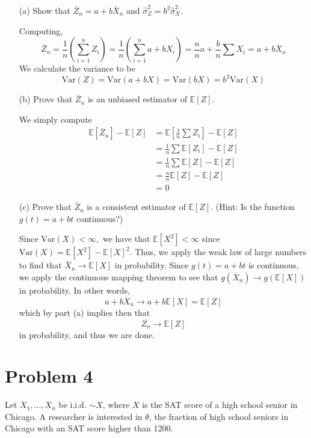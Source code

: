 \documentclass[11pt]{article}
\newcommand{\Var}{\text{Var}}
\newcommand{\bbE}{\mathbb{E}}
\begin{document}
\begin{enumerate}
    \item[(a)] Show that \( \bar{Z}_n = a + b \bar{X}_n \) and \( \hat{\sigma}_Z^2 = b^2 \hat{\sigma}_X^2 \).
\begin{solution}
Computing, 
\[\overline{Z}_n = \frac{1}{n}(\sum_{i=1}^n Z_i) = \frac{1}{n}(\sum_{i=1}^n a + bX_i)=  \frac{n}{n}a + \frac{b}{n}\sum X_i = a + b \overline{X}_n \]
We calculate the variance to be 
\[\Var(Z) = \Var(a + bX) = \Var(bX) = b^2 \Var(X)\]
\end{solution}
    \item[(b)] Prove that \( \bar{Z}_n \) is an unbiased estimator of \( \mathbb{E}[Z] \).
\begin{solution}
    We simply compute 
\begin{align*}
    \bbE[\overline{Z}_n] - \bbE[Z] &= \bbE[\frac{1}{n} \sum Z_i] - \bbE[Z]\\
    &= \frac{1}{n} \sum \bbE[Z_i] - \bbE[Z]\\
    &= \frac{1}{n}\sum \bbE[{Z}] - \bbE[Z]\\
    &= \frac{n}{n}\bbE[Z] - \bbE[Z]\\
    &= 0
\end{align*}
\end{solution}
    \item[(c)] Prove that \( \bar{Z}_n \) is a consistent estimator of \( \mathbb{E}[Z] \). (Hint: Is the function \( g(t) = a + bt \) continuous?)
    \begin{solution}
Since $\Var(X) < \infty,$ we have that $\bbE[X^2] < \infty$ since $\Var(X) = \bbE[X^2] - \bbE[X]^2.$ Thus, we apply the weak law of large numbers to find that $\bar{X}_n \to \bbE[X]$ in probability. Since $g(t) = a + bt$ is continuous, we apply the continuous mapping theorem to see that $g(\overline{X}_n) \to g(\bbE[X])$ in probability. In other words, 
\[a + b \overline{X}_n \to a + b \bbE[X] = \bbE[Z] \] which by part (a) implies then that 
\[\overline{Z_n} \to \bbE[Z]\] in probability, and thus we are done.
    \end{solution}
\end{enumerate}

\newpage
\section*{Problem 4}
Let \( X_1, \ldots, X_n \) be i.i.d. \( \sim X \), where \( X \) is the SAT score of a high school senior in Chicago. A researcher is interested in \( \theta \), the fraction of high school seniors in Chicago with an SAT score higher than 1200.
\end{document}
